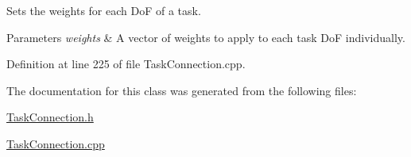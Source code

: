Sets the weights for each DoF of a task. 
\begin{DoxyParams}{Parameters}
{\em weights} & A vector of weights to apply to each task DoF individually. \\
\hline
\end{DoxyParams}


Definition at line 225 of file Task\+Connection.\+cpp.



The documentation for this class was generated from the following files\+:\begin{DoxyCompactItemize}
\item 
\hyperlink{TaskConnection_8h}{Task\+Connection.\+h}\item 
\hyperlink{TaskConnection_8cpp}{Task\+Connection.\+cpp}\end{DoxyCompactItemize}
